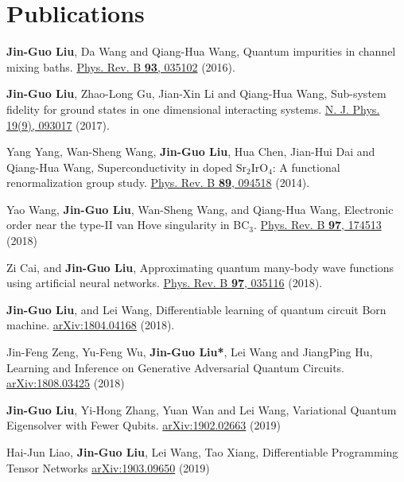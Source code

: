 \documentclass[letterpaper]{article}
\renewenvironment{itemize}{
  \begin{list}{}{
    \setlength{\leftmargin}{1.5em}
  }
}{
  \end{list}
}
\begin{document}
\section*{Publications}
\begin{itemize}
    \item [1] {\bf Jin-Guo Liu}, Da Wang and Qiang-Hua Wang, Quantum impurities in channel mixing baths. \href{https://journals.aps.org/prb/abstract/10.1103/PhysRevB.93.035102}{Phys. Rev. B {\bf 93}, 035102} (2016).
    \item [2] {\bf Jin-Guo Liu}, Zhao-Long Gu, Jian-Xin Li and Qiang-Hua Wang, Sub-system fidelity for ground states in one dimensional interacting systems. \href{http://iopscience.iop.org/article/10.1088/1367-2630/aa6a4b}{N. J. Phys. 19(9), 093017} (2017).
    \item [3] Yang Yang, Wan-Sheng Wang, {\bf Jin-Guo Liu}, Hua Chen, Jian-Hui Dai and Qiang-Hua Wang, Superconductivity in doped ${\mathrm{Sr}}_{2}{\mathrm{IrO}}_{4}$: A functional renormalization group study. \href{https://journals.aps.org/prb/abstract/10.1103/PhysRevB.89.094518}{Phys. Rev. B {\bf 89}, 094518} (2014).
    \item [4] Yao Wang, {\bf Jin-Guo Liu}, Wan-Sheng Wang, and Qiang-Hua Wang, Electronic order near the type-II van Hove singularity in BC${}_3$. \href{https://journals.aps.org/prb/abstract/10.1103/PhysRevB.97.174513}{Phys. Rev. B {\bf 97}, 174513} (2018)
    \item [5] Zi Cai, and {\bf Jin-Guo Liu}, Approximating quantum many-body wave functions using artificial neural networks. \href{https://journals.aps.org/prb/abstract/10.1103/PhysRevB.97.035116}{Phys. Rev. B {\bf 97}, 035116} (2018).
    \item [6] {\bf Jin-Guo Liu}, and Lei Wang, Differentiable learning of quantum circuit Born machine. \href{https://arxiv.org/abs/1804.04168}{arXiv:1804.04168} (2018).
    \item [7] Jin-Feng Zeng, Yu-Feng Wu, {\bf Jin-Guo Liu*}, Lei Wang and JiangPing Hu, Learning and Inference on Generative Adversarial Quantum Circuits. \href{https://arxiv.org/abs/1808.03425}{arXiv:1808.03425} (2018)
    \item [8] {\bf Jin-Guo Liu}, Yi-Hong Zhang, Yuan Wan and Lei Wang, Variational Quantum Eigensolver with Fewer Qubits. \href{https://arxiv.org/abs/1902.02663}{arXiv:1902.02663} (2019)
    \item [9] Hai-Jun Liao, {\bf Jin-Guo Liu}, Lei Wang, Tao Xiang, Differentiable Programming Tensor Networks \href{https://arxiv.org/abs/1903.09650}{arXiv:1903.09650} (2019)

\end{itemize}
\end{document}
